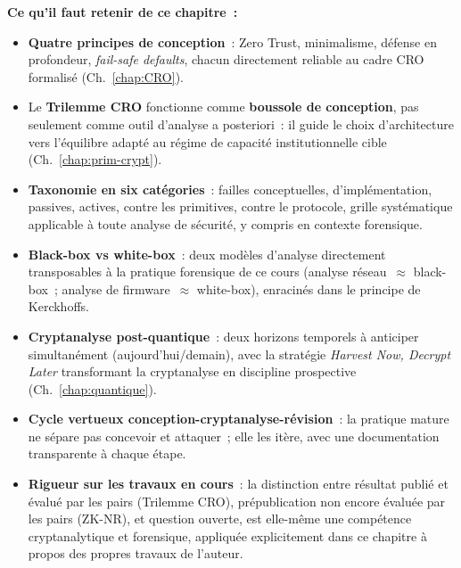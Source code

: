 \begin{boxresume}
\textbf{Ce qu'il faut retenir de ce chapitre~:}
\begin{itemize}
    \item \textbf{Quatre principes de conception}~: Zero Trust,
          minimalisme, défense en profondeur, \textit{fail-safe
          defaults}, chacun directement reliable au cadre CRO
          formalisé (Ch.~\ref{chap:CRO}).

    \item Le \textbf{Trilemme CRO} fonctionne comme \textbf{boussole
          de conception}, pas seulement comme outil d'analyse a
          posteriori~: il guide le choix d'architecture vers
          l'équilibre adapté au régime de capacité institutionnelle
          cible (Ch.~\ref{chap:prim-crypt}).

    \item \textbf{Taxonomie en six catégories}~: failles
          conceptuelles, d'implémentation, passives, actives,
          contre les primitives, contre le protocole, grille
          systématique applicable à toute analyse de sécurité,
          y compris en contexte forensique.

    \item \textbf{Black-box vs white-box}~: deux modèles d'analyse
          directement transposables à la pratique forensique de ce
          cours (analyse réseau~$\approx$ black-box~; analyse de
          firmware~$\approx$ white-box), enracinés dans le principe
          de Kerckhoffs.

    \item \textbf{Cryptanalyse post-quantique}~: deux horizons
          temporels à anticiper simultanément (aujourd'hui/demain),
          avec la stratégie \textit{Harvest Now, Decrypt Later}
          transformant la cryptanalyse en discipline prospective
          (Ch.~\ref{chap:quantique}).

    \item \textbf{Cycle vertueux conception-cryptanalyse-révision}~:
          la pratique mature ne sépare pas concevoir et attaquer~;
          elle les itère, avec une documentation transparente
          à chaque étape.

    \item \textbf{Rigueur sur les travaux en cours}~: la distinction
          entre résultat publié et évalué par les pairs (Trilemme
          CRO), prépublication non encore évaluée par les pairs (ZK-NR), et
          question ouverte, est elle-même une compétence
          cryptanalytique et forensique, appliquée explicitement
          dans ce chapitre à propos des propres travaux de l'auteur.
\end{itemize}
\end{boxresume}


